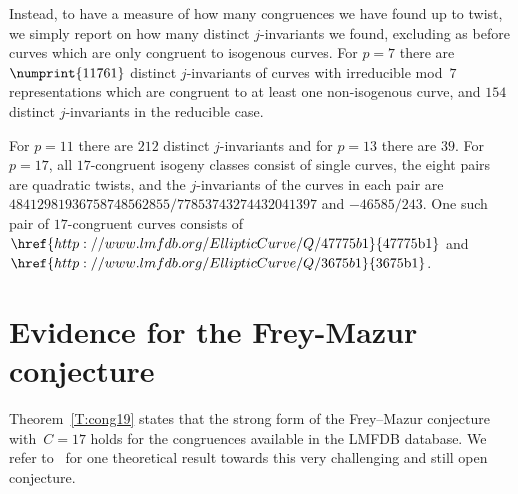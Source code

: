 \documentclass[12pt, reqno]{amsart}
\newcommand{\lmfdbec}[3]{\href{http://www.lmfdb.org/EllipticCurve/Q/#1#2#3}{{\text{\rm#1#2#3}}}}
\numberwithin{equation}{section}
\theoremstyle{definition}
\theoremstyle{remark}
\begin{document}
Instead, to have a measure of how many congruences we have found up to
twist, we simply report on how many distinct $j$-invariants we found,
excluding as before curves which are only congruent to isogenous
curves.  For $p=7$ there are $\numprint{11761}$ distinct
$j$-invariants of curves with irreducible mod~$7$ representations
which are congruent to at least one non-isogenous curve, and $154$
distinct $j$-invariants in the reducible case.

For $p=11$ there are $212$ distinct $j$-invariants and for $p=13$
there are $39$.  For $p=17$, all $17$-congruent isogeny classes
consist of single curves, the eight pairs are quadratic twists, and
the $j$-invariants of the curves in each pair are
$48412981936758748562855/77853743274432041397$ and $-46585/243$.  One
such pair of $17$-congruent curves consists of $\lmfdbec{47775}{b}{1}$
and~$\lmfdbec{3675}{b}{1}$.

\section{Evidence for the Frey-Mazur conjecture}
\label{S:Frey-Mazur}

Theorem~\ref{T:cong19} states that the strong form of the
Frey--Mazur conjecture with~$C=17$ holds for the congruences available
in the LMFDB database. We refer to~\cite{Halberstadt-Kraus-FreyMazur}
for one theoretical result towards this very challenging and still
open conjecture.
\end{document}
